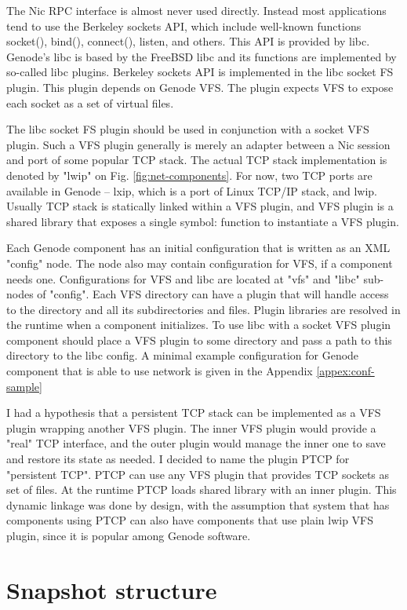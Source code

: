 The Nic RPC interface is almost never used directly. Instead most applications
tend to use the Berkeley sockets API, which include well-known functions
socket(), bind(), connect(), listen, and others. This API is provided by libc.
Genode's libc is based by the FreeBSD libc and its functions are implemented by
so-called libc plugins. Berkeley sockets API is implemented in the libc socket
FS plugin. This plugin depends on Genode VFS. The plugin expects VFS to expose
each socket as a set of virtual files.

The libc socket FS plugin should be used in conjunction with a socket VFS
plugin. Such a VFS plugin generally is merely an adapter between a Nic session
and port of some popular TCP stack. The actual TCP stack implementation is
denoted by "lwip" on Fig. \ref{fig:net-components}. For now, two TCP ports
are available in Genode -- lxip, which is a port of Linux TCP/IP stack, and
lwip. Usually TCP stack is statically linked within a VFS plugin, and VFS
plugin is a shared library that exposes a single symbol: function to
instantiate a VFS plugin.

Each Genode component has an initial configuration that is written as an XML
"config" node. The node also may contain configuration for VFS, if a component
needs one. Configurations for VFS and libc are located at "vfs" and "libc"
sub-nodes of "config". Each VFS directory can have a plugin that will handle
access to the directory and all its subdirectories and files. Plugin libraries
are resolved in the runtime when a component initializes. To use libc with a
socket VFS plugin component should place a VFS plugin to some directory and
pass a path to this directory to the libc config. A minimal example
configuration for Genode component that is able to use network is given in the
Appendix \ref{appex:conf-sample}

I had a hypothesis that a persistent TCP stack can be implemented as a VFS
plugin wrapping another VFS plugin. The inner VFS plugin would provide a "real" 
TCP interface, and the outer plugin would manage the inner one to save and
restore its state as needed. I decided to name the plugin PTCP for "persistent
TCP". PTCP can use any VFS plugin that provides TCP sockets as set of files. At
the runtime PTCP loads shared library with an inner plugin. This dynamic
linkage was done by design, with the assumption that system that has components
using PTCP can also have components that use plain lwip VFS plugin, since it is
popular among Genode software.

\section{Snapshot structure}

